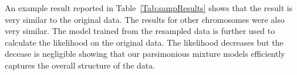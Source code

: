 An example result reported in Table~\ref{Tab:sampResults} shows that the result is very similar to the original data. The results for other chromosomes were also very similar. The model trained from the resampled data is further used to calculate the likelihood on the original data. The likelihood decreases but the decease is negligible showing that our parsimonious mixture models efficiently captures the overall structure of the data.
